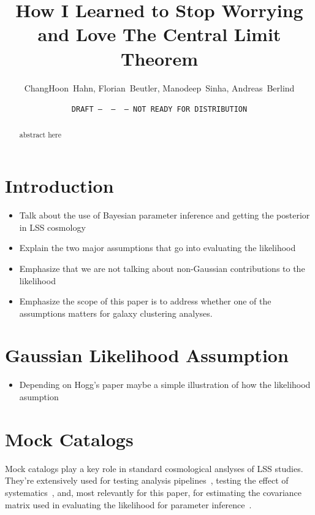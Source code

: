 \documentclass[12pt, letterpaper, preprint]{aastex}
\begin{document}
\sloppy\sloppypar\frenchspacing 

\title{How I Learned to Stop Worrying and Love The Central Limit Theorem}
\date{\texttt{DRAFT~---~\githash~---~\gitdate~---~NOT READY FOR DISTRIBUTION}}
\author{ChangHoon~Hahn, Florian~Beutler, Manodeep~Sinha, Andreas~Berlind}

\begin{abstract}
    abstract here 
\end{abstract}


\section{Introduction}
\begin{itemize}
    \item Talk about the use of Bayesian parameter inference and getting the posterior in LSS cosmology 
    \item Explain the two major assumptions that go into evaluating the likelihood
    \item Emphasize that we are not talking about non-Gaussian contributions to the likelihood
    \item Emphasize the scope of this paper is to address whether one of the assumptions matters for 
        galaxy clustering analyses. 
\end{itemize}

\section{Gaussian Likelihood Assumption}
\begin{itemize}
    \item Depending on Hogg's paper maybe a simple illustration of how the likelihood asumption 
\end{itemize}


\section{Mock Catalogs}
Mock catalogs play a key role in standard cosmological anslyses of LSS 
studies. They're extensively used for testing analysis 
pipelines~\cite[(mock challenege papers)][]{beutler2017}, 
testing the effect of systematics~\citep{hahn2017}, and, most relevantly 
for this paper, for estimating the covariance matrix used in evaluating 
the likelihood for parameter inference~\citep[cite the bunch of other papers][]{beutler2017}.
\end{document}
